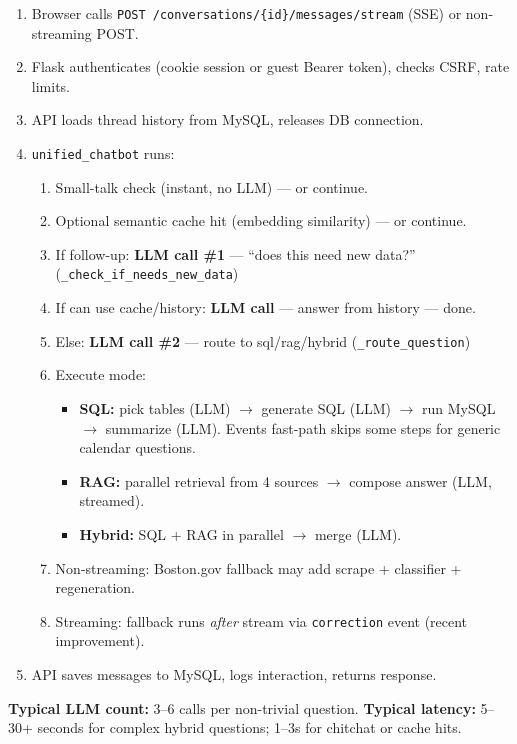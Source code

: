 \documentclass[11pt,a4paper]{article}
\begin{document}
\begin{enumerate}
  \item Browser calls \texttt{POST /conversations/\{id\}/messages/stream} (SSE) or non-streaming POST.
  \item Flask authenticates (cookie session or guest Bearer token), checks CSRF, rate limits.
  \item API loads thread history from MySQL, releases DB connection.
  \item \texttt{unified\_chatbot} runs:
  \begin{enumerate}
    \item Small-talk check (instant, no LLM) --- or continue.
    \item Optional semantic cache hit (embedding similarity) --- or continue.
    \item If follow-up: \textbf{LLM call \#1} --- ``does this need new data?'' (\texttt{\_check\_if\_needs\_new\_data})
    \item If can use cache/history: \textbf{LLM call} --- answer from history --- done.
    \item Else: \textbf{LLM call \#2} --- route to sql/rag/hybrid (\texttt{\_route\_question})
    \item Execute mode:
    \begin{itemize}
      \item \textbf{SQL:} pick tables (LLM) $\rightarrow$ generate SQL (LLM) $\rightarrow$ run MySQL $\rightarrow$ summarize (LLM). Events fast-path skips some steps for generic calendar questions.
      \item \textbf{RAG:} parallel retrieval from 4 sources $\rightarrow$ compose answer (LLM, streamed).
      \item \textbf{Hybrid:} SQL + RAG in parallel $\rightarrow$ merge (LLM).
    \end{itemize}
    \item Non-streaming: Boston.gov fallback may add scrape + classifier + regeneration.
    \item Streaming: fallback runs \emph{after} stream via \texttt{correction} event (recent improvement).
  \end{enumerate}
  \item API saves messages to MySQL, logs interaction, returns response.
\end{enumerate}

\textbf{Typical LLM count:} 3--6 calls per non-trivial question. \textbf{Typical latency:} 5--30+ seconds for complex hybrid questions; 1--3s for chitchat or cache hits.
\end{document}
